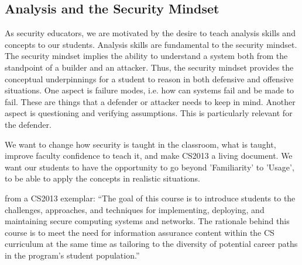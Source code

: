 \subsection{Analysis and the Security Mindset}
As security educators, we are motivated by the desire to teach analysis skills and concepts
to our students.
Analysis skills are fundamental to the security mindset.  The security
mindset implies the ability to understand a system both from the
standpoint of a builder and an attacker.  Thus, the security mindset
provides the conceptual underpinnings for a student to reason in both
defensive and offensive situations.  One aspect is failure modes,
i.e. how can systems fail and be made to fail.  These are things that
a defender or attacker needs to keep in mind.  Another aspect is
questioning and verifying assumptions.  This is particularly relevant
for the defender.

We want to change how security is taught in the classroom, what is taught, improve 
faculty confidence to teach it, and make CS2013 a living document.  We want our students to 
have the opportunity to go beyond 
'Familiarity' to 'Usage', to be able to apply the concepts in realistic situations.


\noindent from a CS2013 exemplar: ``The goal of this course is to introduce students to the challenges, approaches, and techniques 
for implementing, deploying, and maintaining secure computing systems and networks. The rationale behind this 
course is to meet the
need for information assurance content within the CS curriculum at the same time as tailoring to the diversity of
potential career paths in the program's student population.''
